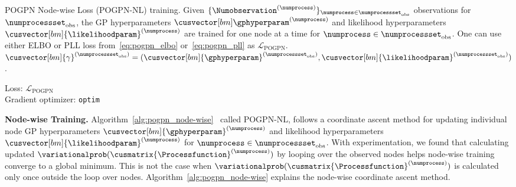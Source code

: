 \begin{algorithm}
      \SetAlgoLined
      \caption{POGPN Node-wise Loss (POGPN-NL) training. Given $\{\Numobservation^{(\numprocess)}\}_{\numprocess\in\numprocessset_{\text{obs}}}$ observations for $\numprocessset_{\text{obs}}$, the GP hyperparameters $\cusvector[bm]\gphyperparam^{(\numprocess)}$ and likelihood hyperparameters $\cusvector[bm]{\likelihoodparam}^{(\numprocess)}$ are trained for one node at a time for $\numprocess\in\numprocessset_{\text{obs}}$. One can use either ELBO or PLL loss from~\ref{eq:pogpn_elbo} or~\ref{eq:pogpn_pll} as $\mathcal{L}_{\text{POGPN}}$. $\cusvector[bm]{\gamma}^{(\numprocessset_{\text{obs}})}=(\cusvector[bm]{\gphyperparam}^{(\numprocessset_{\text{obs}})}, \cusvector[bm]{\likelihoodparam}^{(\numprocessset_{\text{obs}})})$.}\label{alg:pogpn_node-wise}


      \SetInd{2em}{1em}
      \Indp %
      Loss: $\mathcal{L}_{\text{POGPN}}$\\
      Gradient optimizer: \texttt{optim}\\
      \Indm %
      \SetInd{1em}{1em}

\end{algorithm}

\textbf{Node-wise Training.} Algorithm~\ref{alg:pogpn_node-wise}  called POGPN-NL, follows a coordinate ascent method for updating individual node GP hyperparameters $\cusvector[bm]{\gphyperparam}^{(\numprocess)}$ and likelihood hyperparameters $\cusvector[bm]{\likelihoodparam}^{(\numprocess)}$ for $\numprocess\in\numprocessset_{\text{obs}}$. With experimentation, we found that calculating updated $\variationalprob(\cusmatrix{\Processfunction}^{(\numprocess)})$ by looping over the observed nodes helps node-wise training converge to a global minimum. This is not the case when $\variationalprob(\cusmatrix{\Processfunction}^{(\numprocess)})$ is calculated only once outside the loop over nodes. Algorithm~\ref{alg:pogpn_node-wise} explains the node-wise coordinate ascent method.